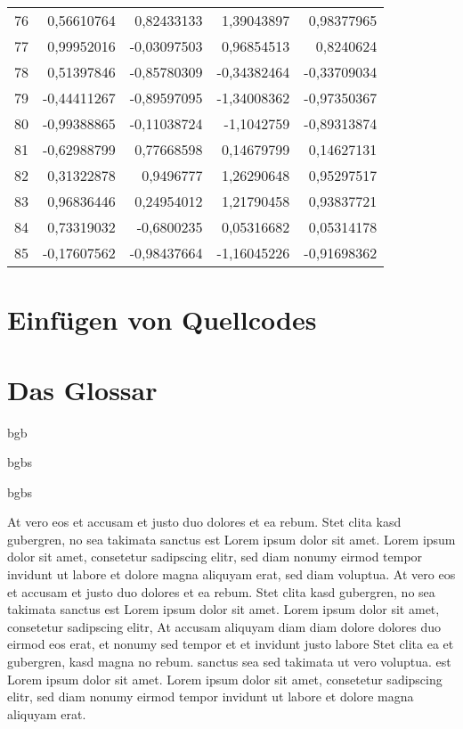 \begin{longtable}{lrrrr}
 76 & 0,56610764 & 0,82433133 & 1,39043897 & 0,98377965 \\
 77 & 0,99952016 & -0,03097503 & 0,96854513 &  0,8240624 \\
 78 & 0,51397846 & -0,85780309 & -0,34382464 & -0,33709034 \\
 79 & -0,44411267 & -0,89597095 & -1,34008362 & -0,97350367 \\
 80 & -0,99388865 & -0,11038724 & -1,1042759 & -0,89313874 \\
 81 & -0,62988799 & 0,77668598 & 0,14679799 & 0,14627131 \\
 82 & 0,31322878 &  0,9496777 & 1,26290648 & 0,95297517 \\
 83 & 0,96836446 & 0,24954012 & 1,21790458 & 0,93837721 \\
 84 & 0,73319032 & -0,6800235 & 0,05316682 & 0,05314178 \\
 85 & -0,17607562 & -0,98437664 & -1,16045226 & -0,91698362 \\
\end{longtable}


\section{Einfügen von Quellcodes}\label{sec:listings}



\section{Das Glossar}\label{sec:glossary}

\Gls{bgb}


\glspl{bgb}

\Glspl{bgb}



At vero eos et accusam et justo duo dolores et ea rebum. Stet clita kasd gubergren, no sea takimata sanctus est Lorem ipsum dolor sit amet. Lorem ipsum dolor sit amet, consetetur sadipscing elitr, sed diam nonumy eirmod tempor invidunt ut labore et dolore magna aliquyam erat, sed diam voluptua. At vero eos et accusam et justo duo dolores et ea rebum. Stet clita kasd gubergren, no sea takimata sanctus est Lorem ipsum dolor sit amet. Lorem ipsum dolor sit amet, consetetur sadipscing elitr, At accusam aliquyam diam diam dolore dolores duo eirmod eos erat, et nonumy sed tempor et et invidunt justo labore Stet clita ea et gubergren, kasd magna no rebum. sanctus sea sed takimata ut vero voluptua. est Lorem ipsum dolor sit amet. Lorem ipsum dolor sit amet, consetetur sadipscing elitr, sed diam nonumy eirmod tempor invidunt ut labore et dolore magna aliquyam erat.   

